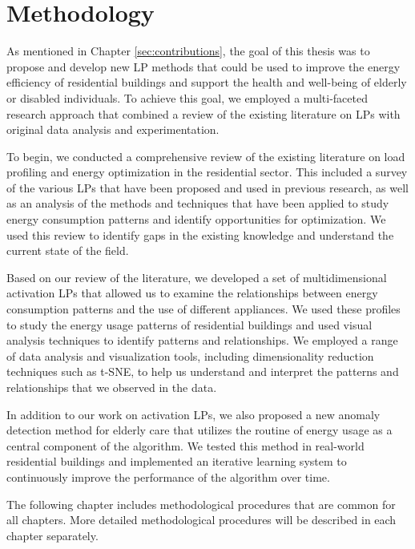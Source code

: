 
\chapter{Methodology} %
\label{chapter3} 

As mentioned in Chapter \ref{sec:contributions}, the goal of this thesis was to propose and develop new LP methods that could be used to improve the energy efficiency of residential buildings and support the health and well-being of elderly or disabled individuals. 
To achieve this goal, we employed a multi-faceted research approach that combined a review of the existing literature on LPs with original data analysis and experimentation.

To begin, we conducted a comprehensive review of the existing literature on load profiling and energy optimization in the residential sector.
This included a survey of the various LPs that have been proposed and used in previous research,
as well as an analysis of the methods and techniques that have been applied to study energy consumption patterns and identify opportunities for optimization.
We used this review to identify gaps in the existing knowledge and understand the current state of the field.

Based on our review of the literature, we developed a set of multidimensional activation LPs that allowed us to examine the relationships between energy consumption patterns and the use of different appliances.
We used these profiles to study the energy usage patterns of residential buildings and used visual analysis techniques to identify patterns and relationships.
We employed a range of data analysis and visualization tools, including dimensionality reduction techniques such as t-SNE, to help us understand and interpret the patterns and relationships that we observed in the data.

In addition to our work on activation LPs, we also proposed a new anomaly detection method for elderly care that utilizes the routine of energy usage as a central component of the algorithm. 
We tested this method in real-world residential buildings and implemented an iterative learning system to continuously improve the performance of the algorithm over time.

The following chapter includes methodological procedures that are common for all chapters.
More detailed methodological procedures will be described in each chapter separately. 

